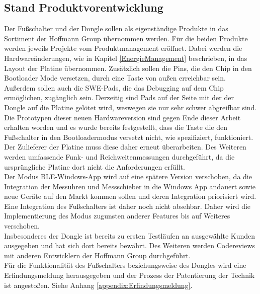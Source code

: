 \subsection{Stand Produktvorentwicklung}
Der Fußschalter und der Dongle sollen als eigenständige Produkte in das Sortiment der Hoffmann Group übernommen werden. Für die beiden Produkte werden jeweils Projekte vom Produktmanagement eröffnet. Dabei werden die Hardwareänderungen, wie in Kapitel \ref{EnergieManagement} beschrieben, in das Layout der Platine übernommen. Zusätzlich sollen die Pins, die den Chip in den Bootloader Mode versetzen, durch eine Taste von außen erreichbar sein. Außerdem sollen auch die SWE-Pads, die das Debugging auf dem Chip ermöglichen, zugänglich sein. Derzeitig sind Pads auf der Seite mit der der Dongle auf die Platine gelötet wird, weswegen sie nur sehr schwer abgreifbar sind. Die Prototypen dieser neuen Hardwareversion sind gegen Ende dieser Arbeit erhalten worden und es wurde bereits festgestellt, dass die Taste die den Fußschalter in den Bootloadermodus versetzt nicht, wie spezifiziert, funktioniert. Der Zulieferer der Platine muss diese daher erneut überarbeiten. Des Weiteren werden umfassende Funk- und Reichweitenmessungen durchgeführt, da die ursprüngliche Platine dort nicht die Anforderungen erfüllt.\\
Der Modus \ac{BLE}-Windows-App wird auf eine spätere Version verschoben, da die Integration der Messuhren und Messschieber in die Windows App andauert sowie neue Geräte auf den Markt kommen sollen und deren Integration priorisiert wird. Eine Integration des Fußschalters ist daher noch nicht absehbar. Daher wird die Implementierung des Modus zugunsten anderer Features bis auf Weiteres verschoben.\\
Insbesonderes der Dongle ist bereits zu ersten Testläufen an ausgewählte Kunden ausgegeben und hat sich dort bereits bewährt. Des Weiteren werden Codereviews mit anderen Entwicklern der Hoffmann Group durchgeführt.\\
Für die Funktionalität des Fußschalters beziehungsweise des Dongles wird eine Erfindungsmeldung herausgegeben und der Prozess der Patentierung der Technik ist angestoßen. Siehe Anhang \ref{appendix:Erfindungsmeldung}.

